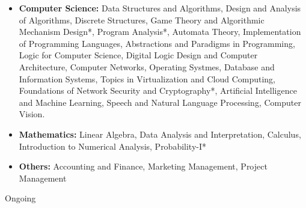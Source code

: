 \begin{itemize}[itemsep = -1.3 mm, leftmargin=*]
% 
\item {\bf Computer Science:} Data Structures and Algorithms, Design 
and Analysis of Algorithms, Discrete Structures, Game Theory and Algorithmic Mechanism Design*, Program Analysis*, Automata Theory, 
Implementation of Programming Languages, Abstractions and Paradigms in 
Programming, Logic for Computer Science, Digital Logic Design and Computer 
Architecture, Computer Networks, Operating Systmes, Database and 
Information Systems, Topics in Virtualization and Cloud Computing,
Foundations of Network Security and Cryptography*, Artificial 
Intelligence and Machine Learning, Speech and Natural Language Processing, Computer Vision.
    
    \item {\bf Mathematics:} Linear Algebra, Data Analysis and Interpretation, Calculus, Introduction to Numerical Analysis, Probability-I*
    \item {\bf Others:} Accounting and Finance, Marketing Management, Project Management
\end{itemize}
\vspace{-13pt}
\hfill * Ongoing